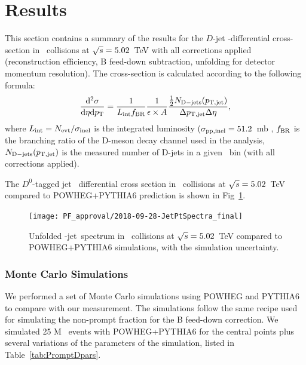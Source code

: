 \section{Results}

This section contains a summary of the results for the  $D$-jet \pt-differential cross-section in \pp\ collisions at $\sqrt{s}=5.02$~TeV  with all corrections applied (reconstruction efficiency, B feed-down subtraction, unfolding for detector momentum resolution).
The cross-section is calculated according to the following formula:
\begin{equation}
\frac{{\rm d}^2\sigma}{{\rm d}\eta {\rm d}p_{\rm T}}=\frac{1}{L_{\rm int}f_{\rm BR}} \frac{1}{\epsilon \times A}  \frac{ \frac{1}{2} N_{\rm D-jets}(p_{\mathrm{T,jet}})}{ \Delta p_{\mathrm{T,jet}}\Delta\eta},
\end{equation}
where $L_{\rm int}=N_{\rm evt}/\sigma_{\rm inel}$ is the integrated luminosity ($\sigma_{\rm pp, inel} = 51.2$~mb 
, $f_{\rm BR}$ is the branching
ratio of the D-meson decay channel used in the analysis, $N_{\rm D-jets}(p_{\mathrm{T,jet}})$ is the measured number of D-jets in a given \ptjet\ bin (with all corrections applied).



The $D^{0}$-tagged jet \pt\ differential cross section in \pp\ collisions at $\sqrt{s}=5.02$~TeV compared to POWHEG+PYTHIA6 prediction is shown in Fig~\ref{fig:pPbJetPt_final_D0}. 
\begin{figure}[bth]
\centering
\texttt{[image: PF\_approval/2018-09-28-JetPtSpectra\_final]}
\caption{Unfolded \Dzero-jet\ spectrum in \pp\ collisions at $\sqrt{s}=5.02$~TeV compared to POWHEG+PYTHIA6 simulations, with the simulation uncertainty.}
\label{fig:pPbJetPt_final_D0}
\end{figure}



\subsubsection{Monte Carlo Simulations}
We performed a set of Monte Carlo simulations using POWHEG and PYTHIA6 to compare with our measurement.
The simulations follow the same recipe used for simulating the non-prompt fraction for the B feed-down correction.
We simulated 25 M \ccbar\ events with POWHEG+PYTHIA6 for the central points plus several variations of the parameters of the simulation, listed in Table~\ref{tab:PromptDpars}.

